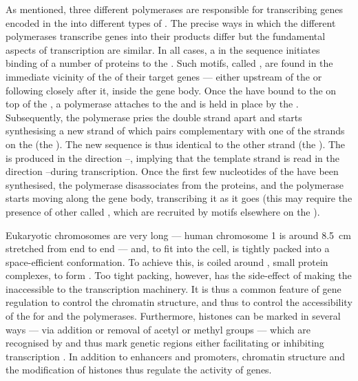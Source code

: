 As mentioned, three different polymerases are responsible for transcribing genes
encoded in the \dna into different types of \rna. The precise ways in which the
different polymerases transcribe genes into their \rna products differ but the
fundamental aspects of transcription are similar. In all cases, a
 in the \dna sequence
initiates binding of a number of \tf proteins to the \dna. Such motifs, called
, are found in the immediate vicinity of the \tss of their
target genes --- either upstream of the \tss or following closely after it,
inside the gene body. Once the \tf[s] have bound to the \dna on top of the \tss,
a polymerase attaches to the \dna and is held in place by the \tf[s].
Subsequently, the polymerase pries the double strand apart and starts
synthesising a new strand of \rna which pairs complementary with one of the
strands on the \dna (the ). The new \rna[’s] sequence is
thus identical to the other \dna strand (the ). The \rna
is produced in the direction \fivep--\threep, implying that the template strand
is read in the direction \threep--\fivep during transcription. Once the first
few nucleotides of the \rna have been synthesised, the polymerase disassociates
from the \tf proteins, and the polymerase starts moving along the gene body,
transcribing it as it goes (this may require the presence of other \tf[s] called
, which are recruited by  motifs elsewhere
on the \dna).

Eukaryotic chromosomes are very long — human chromosome \num{1} is around
\SI{8.5}{\centi\metre} stretched from end to end — and, to fit into the cell, is
tightly packed into a space-efficient conformation. To achieve this, \dna is
coiled around , small protein complexes, to form
. Too tight packing, however, has the
side-effect of making the \dna inaccessible to the transcription machinery. It
is thus a common feature of gene regulation to control the chromatin structure,
and thus to control the accessibility of the \dna for \tf[s] and the
polymerases. Furthermore, histones can be marked in several ways — via addition
or removal of acetyl or methyl groups — which are recognised by \tf[s] and thus
mark genetic regions either facilitating or inhibiting transcription
\citep{Alberts:2002}. In addition to enhancers and promoters, chromatin
structure and the modification of histones thus regulate the activity of genes.

